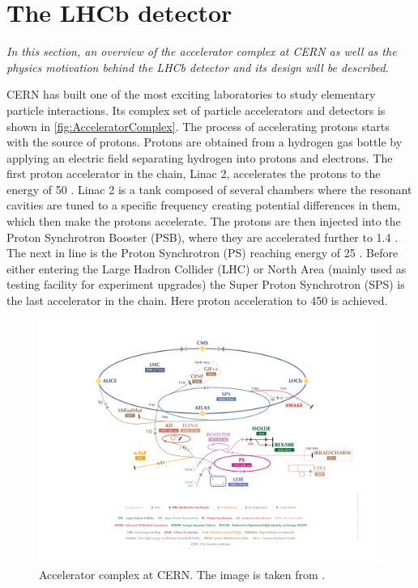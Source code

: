 \chapter{The LHCb detector}
\label{chap:dec}

\textit{In this section, an overview of the accelerator complex at CERN as well as the physics motivation behind the \Gls{LHCb} detector and its design will be described.}

CERN has built one of the most exciting laboratories to study elementary particle interactions. Its complex set of particle accelerators and detectors is shown in \autoref{fig:AcceleratorComplex}. The process of accelerating protons starts with the source of protons. Protons are obtained from a hydrogen gas bottle by applying an electric field separating hydrogen into protons and electrons. The first proton accelerator in the chain, Linac 2, accelerates the protons to the energy of 50 \mev. Linac 2 is a tank composed of several chambers where the resonant cavities are tuned to a specific frequency creating potential differences in them, which then make the protons accelerate. The protons are then injected into the Proton Synchrotron Booster (\Gls{PSB}), where they are accelerated further to 1.4 \gev. The next in line is the Proton Synchrotron (\Gls{PS}) reaching energy of 25 \gev. Before either entering the Large Hadron Collider (\Gls{LHC}) or North Area (mainly used as testing facility for experiment upgrades) the Super Proton Synchrotron (\Gls{SPS}) is the last accelerator in the chain. Here proton acceleration to 450 \gev is achieved.

\begin{figure}
  \centering
  \includegraphics[scale = 1.0]{figs/detector/AccComplex.png}
	\caption{Accelerator complex at CERN. The image is taken from \cite{complex}.}
  \label{fig:AcceleratorComplex}
\end{figure}

